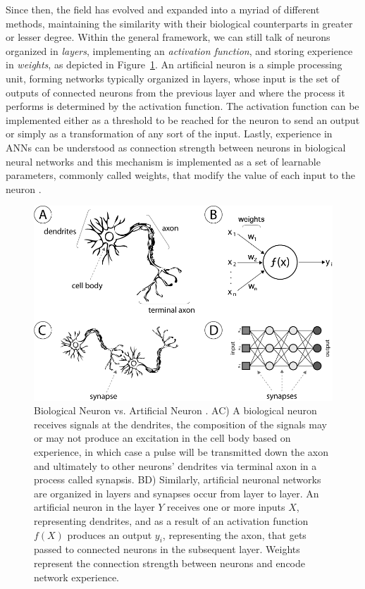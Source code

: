 Since then, the field has evolved and expanded into a myriad of different methods, maintaining the similarity with their biological counterparts in greater or lesser degree.
Within the general framework, we can still talk of neurons organized in \emph{layers}, implementing an \emph{activation function}, and storing experience in \emph{weights}, as depicted in Figure~\ref{fig:sec:theory:neurons}.
An artificial neuron is a simple processing unit, forming networks typically organized in layers, whose input is the set of outputs of connected neurons from the previous layer and where the process it performs is determined by the activation function.
The activation function can be implemented either as a threshold to be reached for the neuron to send an output or simply as a transformation of any sort of the input.
Lastly, experience in ANNs can be understood as connection strength between neurons in biological neural networks and this mechanism is implemented as a set of learnable parameters, commonly called weights, that modify the value of each input to the neuron \cite{Hinton1989}.

\begin{figure}[t]
  \includegraphics[width=\textwidth]{gfx/neurons}
  \caption{
    Biological Neuron vs. Artificial Neuron \cite{Honorio2013}.
    AC) A biological neuron receives signals at the dendrites, the composition of the signals may or may not produce an excitation in the cell body based on experience, in which case a pulse will be transmitted down the axon and ultimately to other neurons' dendrites via terminal axon in a process called synapsis.
    BD) Similarly, artificial neuronal networks are organized in layers and synapses occur from layer to layer.
    An artificial neuron in the layer $Y$ receives one or more inputs $X$, representing dendrites, and as a result of an activation function $f(X)$ produces an output $y_i$, representing the axon, that gets passed to connected neurons in the subsequent layer.
    Weights represent the connection strength between neurons and encode network experience.
  }
  \label{fig:sec:theory:neurons}
\end{figure}

